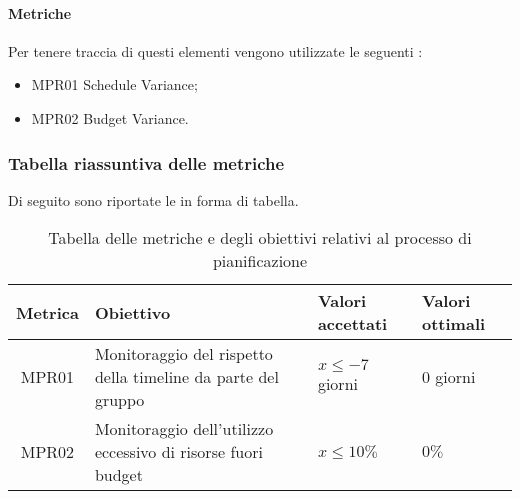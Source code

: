 \paragraph{Metriche}%
Per tenere traccia di questi elementi vengono utilizzate le seguenti :
\begin{itemize}
\item MPR01 Schedule Variance;
\item MPR02 Budget Variance.
\end{itemize}

\subsubsection{Tabella riassuntiva delle metriche}%
Di seguito sono riportate le  in forma di tabella.
\begin{table}[H]
		\begin{center}
			\setlength{\aboverulesep}{0pt}
			\setlength{\belowrulesep}{0pt}
			\setlength{\extrarowheight}{.75ex}
			\begin{tabular}{ c C{6cm} C{3cm} C{3cm} }
				\textbf{Metrica} & \textbf{Obiettivo} & \textbf{Valori accettati} & \textbf{Valori ottimali}  \\
				\toprule
				MPR01 & Monitoraggio del rispetto della timeline da parte del gruppo \gruppo{} & $ x \leq -7$ giorni & $0$ giorni \\
				MPR02 & Monitoraggio dell'utilizzo eccessivo di risorse fuori budget & $ x \leq 10 \%$ & $0 \%$ \\
				\bottomrule
			\end{tabular}
			\caption{Tabella delle metriche e degli obiettivi relativi al processo di pianificazione}
		\end{center}
	\end{table}



